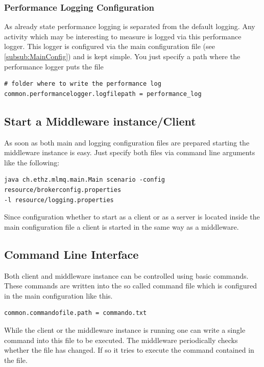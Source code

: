 \documentclass[a4paper]{article}
\begin{document}
\subsubsection{Performance Logging Configuration}
\label{subsub:PerfLogConfig}

As already state performance logging is separated from the default logging. Any activity which may be interesting to measure is logged via this performance logger. This logger is configured via the main configuration file (see \ref{subsub:MainConfig}) and is kept simple. You just specify a path where the performance logger puts the file

\begin{verbatim} 
# folder where to write the performance log
common.performancelogger.logfilepath = performance_log
\end{verbatim}

\subsection{Start a Middleware instance/Client}
As soon as both main and logging configuration files are prepared starting the middleware instance is easy. Just specify both files via command line arguments like the following:

\begin{verbatim} 
java ch.ethz.mlmq.main.Main scenario -config resource/brokerconfig.properties 
-l resource/logging.properties
\end{verbatim}

Since configuration whether to start as a client or as a server is located inside the main configuration file a client is started in the same way as a middleware.

\subsection{Command Line Interface}

Both client and middleware instance can be controlled using basic commands. These commands are written into the so called command file which is configured in the main configuration like this.

\begin{verbatim}
common.commandofile.path = commando.txt
\end{verbatim}

While the client or the middleware instance is running one can write a single command into this file to be executed. The middleware periodically checks whether the file has changed. If so it tries to execute the command contained in the file.
\end{document}
